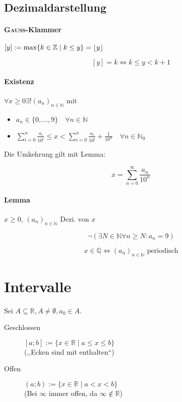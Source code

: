 \subsection{Dezimaldarstellung}

\paragraph{\textsc{Gauss}-Klammer}
$[y] := \max \{ k \in \mathbb{Z} \mid k \leq y \} = \lfloor y\rfloor$

$$[y] = k \Leftrightarrow k \leq y < k + 1$$

\paragraph{Existenz} $\forall x \geq 0 \exists ! (a_n)_{n \in \mathbb{N}}$ mit

\begin{itemize}
  \item $a_n \in \{ 0, \dots, 9 \} \quad \forall n \in \mathbb{N}$
  \item $\sum_{i = 0}^n \frac{a_i}{10^i} \leq x < \sum_{i = 0}^n \frac{a_i}{10^i} + \frac{1}{10^n} \quad \forall n \in \mathbb{N}_0$
\end{itemize}

Die Umkehrung gilt mit Lemma:

\begin{mzImportant}
  $$x = \sum_{n = 0}^\infty \frac{a_n}{10^n}$$
\end{mzImportant}

\paragraph{Lemma} $x \geq 0$, $(a_n)_{n \in \mathbb{N}}$ Dezi. von $x$

$$\boldsymbol{\neg} (\exists N \in \mathbb{N} \forall n \geq N: a_n = 9)$$

$$x \in \mathbb{Q} \Leftrightarrow (a_n)_{n \in \mathbb{N}} \text{ periodisch}$$

\section{Intervalle}

Sei $A \subseteq \mathbb{R}, A \neq \emptyset, a_0 \boldsymbol{\in} A$.

\begin{description}
  \item [Geschlossen]
        $[a;b] := \{ x \in \mathbb{R} \mid a \boldsymbol{\leq} x \boldsymbol{\leq} b \}$ \\
        (,,Ecken sind mit enthalten``)

  \item [Offen]
        $(a;b) := \{x \in \mathbb{R} \mid a \boldsymbol{<} x \boldsymbol{<} b\}$ \\
        (Bei $\infty$ immer offen, da $\infty \notin \mathbb{R}$)
\end{description}

